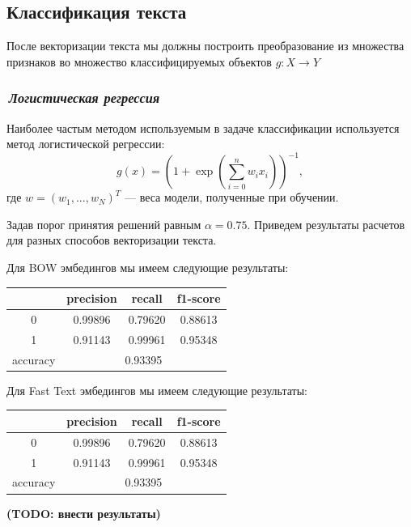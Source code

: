 \documentclass[12pt]{article}
\begin{document}
\subsection*{Классификация текста}
После векторизации текста мы должны построить преобразование из множества признаков во множество классифицируемых объектов $g: X \rightarrow Y$

\subsubsection*{\it\,Логистическая регрессия}
Наиболее частым методом используемым в задаче классификации используется метод логистической регрессии:
$$
g(x) = \left(1 + \exp{ \left( \sum_{i=0}^n w_i x_i  \right) }\right)^{-1},
$$
где $w=(w_1, ..., w_N)^T$ --- веса модели, полученные при обучении.


Задав порог принятия решений равным $\alpha = 0.75$. Приведем результаты расчетов для разных способов векторизации текста.

Для BOW эмбедингов мы имеем следующие результаты:
\begin{center}
  \begin{tabular}{ | c | c | c | c |}
    \hline
      & precision & recall & f1-score \\ \hline
    0 & 0.99896 & 0.79620 & 0.88613 \\ \hline
    1 & 0.91143 & 0.99961 & 0.95348 \\ \hline
    accuracy & \multicolumn{3}{c|}{0.93395} \\                   
    \hline
  \end{tabular}
\end{center}


Для Fast Text эмбедингов мы имеем следующие результаты:
\begin{center}
  \begin{tabular}{ | c | c | c | c |}
    \hline
      & precision & recall & f1-score \\ \hline
    0 & 0.99896 & 0.79620 & 0.88613 \\ \hline
    1 & 0.91143 & 0.99961 & 0.95348 \\ \hline
    accuracy & \multicolumn{3}{c|}{0.93395} \\                   
    \hline
  \end{tabular}
\end{center}
{\bf\color{amaranth} (TODO: внести результаты)}
\end{document}
